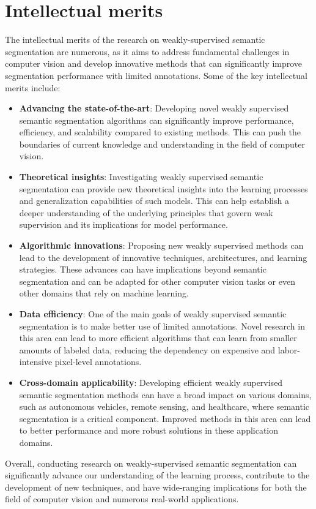 \documentclass[11pt]{article}
\begin{document}
\section{Intellectual merits}
The intellectual merits of the research on weakly-supervised semantic segmentation are numerous, as it aims to address fundamental challenges in computer vision and develop innovative methods that can significantly improve segmentation performance with limited annotations. Some of the key intellectual merits include:
\begin{itemize}
    \item \textbf{Advancing the state-of-the-art}: Developing novel weakly supervised semantic segmentation algorithms can significantly improve performance, efficiency, and scalability compared to existing methods. This can push the boundaries of current knowledge and understanding in the field of computer vision.
    \item \textbf{Theoretical insights}: Investigating weakly supervised semantic segmentation can provide new theoretical insights into the learning processes and generalization capabilities of such models. This can help establish a deeper understanding of the underlying principles that govern weak supervision and its implications for model performance.
     \item \textbf{Algorithmic innovations}: Proposing new weakly supervised methods can lead to the development of innovative techniques, architectures, and learning strategies. These advances can have implications beyond semantic segmentation and can be adapted for other computer vision tasks or even other domains that rely on machine learning.
     \item \textbf{Data efficiency}: One of the main goals of weakly supervised semantic segmentation is to make better use of limited annotations. Novel research in this area can lead to more efficient algorithms that can learn from smaller amounts of labeled data, reducing the dependency on expensive and labor-intensive pixel-level annotations.
     \item \textbf{Cross-domain applicability}: Developing efficient weakly supervised semantic segmentation methods can have a broad impact on various domains, such as autonomous vehicles, remote sensing, and healthcare, where semantic segmentation is a critical component. Improved methods in this area can lead to better performance and more robust solutions in these application domains.

\end{itemize}
Overall, conducting research on weakly-supervised semantic segmentation can significantly advance our understanding of the learning process, contribute to the development of new techniques, and have wide-ranging implications for both the field of computer vision and numerous real-world applications.
\end{document}
